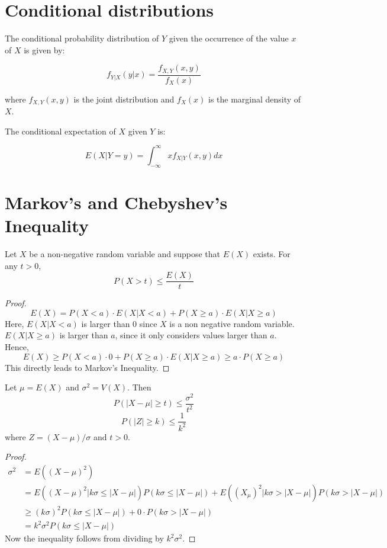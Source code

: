 \documentclass[12pt,letterpaper]{amsbook}
\theoremstyle{definition}
\begin{document}
\section{Conditional distributions}

The conditional probability distribution of $Y$ given the occurrence of the value $x$ of $X$ is given by:

\[ f_{Y|X} (y|x) = \frac{f_{X,Y}(x,y)}{f_X(x)}\]

where $f_{X,Y}(x,y)$ is the joint distribution and $f_X(x)$ is the marginal density of $X$.

The conditional expectation of $X$ given $Y$ is:

\[E(X|Y=y) = \int_{-\infty}^{\infty} x f_{X|Y}(x,y) dx \]

\section{Markov's and Chebyshev's Inequality}

\begin{theorem}
  Let $X$ be a non-negative random variable and suppose that $E(X)$ exists. For any $t > 0$, 
  \[P(X > t) \leq \frac{E(X)}{t}\]
\end{theorem}
\begin{proof}
  \[E(X) = P(X < a) \cdot E(X|X < a) + P(X \geq a) \cdot E(X|X \geq a)\] 
  Here, $E(X|X<a)$ is larger than 0 since $X$ is a non negative random variable. $E(X|X \geq a)$ is larger than $a$, since it only considers values larger than $a$. Hence,
  \[E(X) \geq P(X<a)\cdot 0 + P(X \geq a) \cdot E(X|X \geq a) \geq a \cdot P(X \geq a) \]
  This directly leads to Markov's Inequality.
\end{proof}

\begin{theorem}
  Let $\mu = E(X)$ and $\sigma^2 = V(X)$. Then
  \[P(|X-\mu| \geq t) \leq \frac{\sigma^2}{t^2}\]
  \[ P(|Z| \geq k) \leq \frac{1}{k^2}\]
  where $Z = (X-\mu) / \sigma$ and $t > 0$.
\end{theorem}
\begin{proof}
  \begin{align*}
    \sigma^2 &= E((X-\mu)^2)  \\
             &= E((X-\mu)^2 | k \sigma \leq |X-\mu|) P(k \sigma \leq |X - \mu|) + E((X_\mu)^2 | k \sigma > |X-\mu|)P(k\sigma > |X - \mu|) \\
             &\geq (k \sigma)^2 P(k \sigma \leq |X-\mu|) + 0 \cdot P(k \sigma > |X-\mu|) \\
             &= k^2 \sigma^2 P(k \sigma \leq |X-\mu|)
  \end{align*} 
  Now the inequality follows from dividing by $k^2 \sigma^2$.
\end{proof}
\end{document}
